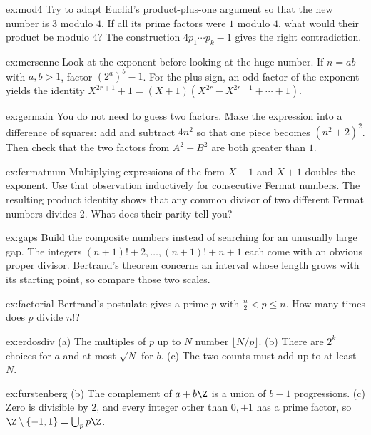\begin{hint}{ex:mod4}
Try to adapt Euclid's product-plus-one argument so that the new number is $3$ modulo $4$. If all its prime factors were $1$ modulo $4$, what would their product be modulo $4$? The construction $4p_1\cdots p_k-1$ gives the right contradiction.
\end{hint}
\begin{hint}{ex:mersenne}
Look at the exponent before looking at the huge number. If $n=ab$ with $a,b>1$, factor $(2^a)^b-1$. For the plus sign, an odd factor of the exponent yields the identity $X^{2r+1}+1=(X+1)(X^{2r}-X^{2r-1}+\cdots+1)$.
\end{hint}
\begin{hint}{ex:germain}
You do not need to guess two factors. Make the expression into a difference of squares: add and subtract $4n^2$ so that one piece becomes $(n^2+2)^2$. Then check that the two factors from $A^2-B^2$ are both greater than $1$.
\end{hint}
\begin{hint}{ex:fermatnum}
Multiplying expressions of the form $X-1$ and $X+1$ doubles the exponent. Use that observation inductively for consecutive Fermat numbers. The resulting product identity shows that any common divisor of two different Fermat numbers divides $2$. What does their parity tell you?
\end{hint}
\begin{hint}{ex:gaps}
Build the composite numbers instead of searching for an unusually large gap. The integers $(n+1)!+2,\ldots,(n+1)!+n+1$ each come with an obvious proper divisor. Bertrand's theorem concerns an interval whose length grows with its starting point, so compare those two scales.
\end{hint}
\begin{hint}{ex:factorial}
Bertrand's postulate gives a prime $p$ with $\frac n2<p\le n$. How many times does $p$ divide $n!$?
\end{hint}
\begin{hint}{ex:erdosdiv}
(a) The multiples of $p$ up to $N$ number $\lfloor N/p\rfloor$. (b) There are $2^k$ choices for $a$ and at most $\sqrt N$ for $b$. (c) The two counts must add up to at least $N$.
\end{hint}
\begin{hint}{ex:furstenberg}
(b) The complement of $a+b\Z$ is a union of $b-1$ progressions. (c) Zero is divisible by $2$, and every integer other than $0,\pm1$ has a prime factor, so $\Z\setminus\{-1,1\}=\bigcup_p p\Z$.
\end{hint}

